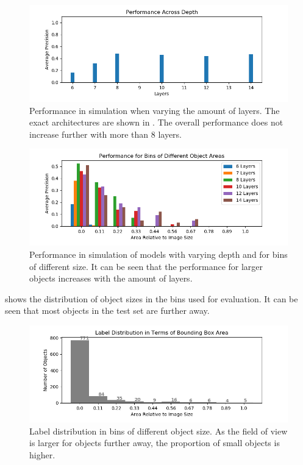 	\begin{figure}[hbtp]
		\centering
		\includegraphics[width=\textwidth]{fig/perf_depth}
		\caption{Performance in simulation when varying the amount of layers. The exact architectures are shown in . The overall performance does not increase further with more than 8 layers.}
		\label{fig:perf_depth}
	\end{figure}


	\begin{figure}[hbtp]
		\centering
		\includegraphics[width=\textwidth]{fig/depth_ap_size}
		\caption{Performance in simulation of models with varying depth and for bins of different size. It can be seen that the performance for larger objects increases with the amount of layers.}
		\label{fig:depth_ap_size}
	\end{figure}
	
	 shows the distribution of object sizes in the bins used for evaluation. It can be seen that most objects in the test set are further away. 
	
	\begin{figure}[hbtp]
		\centering
		\includegraphics[width=\textwidth]{fig/distr_size}
		\caption{Label distribution in bins of different object size. As the field of view is larger for objects further away, the proportion of small objects is higher.}
		\label{fig:size_bins}
	\end{figure}
	
